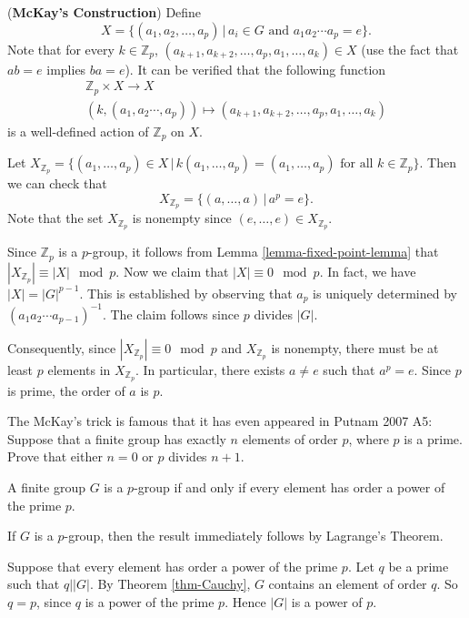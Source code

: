 \begin{sketch}
	(\textbf{McKay's Construction}) Define
	\begin{equation*}
		X = \{(a_1,a_2,\dots, a_p)\,|\, a_i\in G\text{ and }a_1a_2\cdots a_p=e\}.
	\end{equation*}
	Note that for every $k\in\mathbb{Z}_p$, $(a_{k+1},a_{k+2},\dots, a_p,a_1,\dots, a_k)\in X$ (use the fact that $ab = e$ implies $ba = e$). It can be verified that the following function
	\begin{gather*}
		\mathbb{Z}_p \times X\rightarrow X
		\\
		(k,(a_1,a_2\cdots,a_p)) \mapsto  (a_{k+1},a_{k+2},\dots, a_p,a_1,\dots, a_k)
	\end{gather*}
	is a well-defined action of $\mathbb{Z}_p$ on $X$.  
	
	Let $X_{\mathbb{Z}_p} = \{(a_1,\dots, a_p)\in X\,|\, k(a_1,\dots, a_p) =(a_1,\dots, a_p) \text{ for all }k\in \mathbb{Z}_p\}$. Then we can check that
	$$X_{\mathbb{Z}_p} = \{(a,\dots, a)\,|\, a^p=e\}.$$
	Note that the set $X_{\mathbb{Z}_p}$ is nonempty since $(e,\dots, e)\in X_{\mathbb{Z}_p}$.
	
	Since $\mathbb{Z}_p$ is a $p$-group, it follows from Lemma \ref{lemma-fixed-point-lemma} that $|X_{\mathbb{Z}_p}|\equiv |X| \mod p$. Now we claim that $|X| \equiv 0 \mod p$. In fact, we have $|X| = |G|^{p-1}$. This is established by observing that $a_p$ is uniquely determined by $(a_1a_2\cdots a_{p-1})^{-1}$. The claim follows since $p$ divides $|G|$.
	
	Consequently, since $|X_{\mathbb{Z}_p}|\equiv 0 \mod p$ and $X_{\mathbb{Z}_p}$ is nonempty, there must be at least $p$ elements in $X_{\mathbb{Z}_p}$. In particular, there exists $a\neq e$ such that $a^p = e$. Since $p$ is prime, the order of $a$ is $p$. 
\end{sketch}
\begin{remark}
	The McKay's trick is famous that it has even appeared in Putnam 2007 A5: Suppose that a finite group has exactly $n$ elements of order $p$, where
	$p$ is a prime. Prove that either $n=0$ or $p$ divides $n+1$.
\end{remark}
\begin{corollary}
	A finite group $G$ is a $p$-group if and only if every element has order a power of the prime $p$.
\end{corollary}
\begin{sketch}
	If $G$ is a $p$-group, then the result immediately follows by Lagrange's Theorem. 
	
	Suppose that every element has order a power of the prime $p$. Let $q$ be a prime such that $q||G|$. By Theorem \ref{thm-Cauchy}, $G$ contains an element of order $q$. So $q=p$, since $q$ is a power of the prime $p$. Hence $|G|$ is a power of $p$.
\end{sketch}
